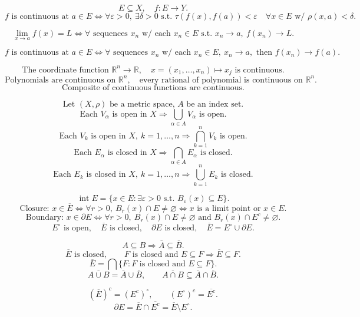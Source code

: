 \documentclass[11pt]{article}
\begin{document}
\[
E\subseteq X,\quad f:E\to Y.
\]
\[
f\text{ is continuous at }a\in E
\Longleftrightarrow
\forall\varepsilon>0,\ \exists\delta>0\text{ s.t. }
\tau(f(x),f(a))<\varepsilon
\quad \forall x\in E\text{ w/ }\rho(x,a)<\delta.
\]

\[
\lim_{x\to a}f(x)=L
\Longleftrightarrow
\forall\text{ sequences }x_n\text{ w/ each }x_n\in E
\text{ s.t. }x_n\to a,\ f(x_n)\to L.
\]

\[
f\text{ is continuous at }a\in E
\Longleftrightarrow
\forall\text{ sequences }x_n\text{ w/ each }x_n\in E,\ x_n\to a,\text{ then }f(x_n)\to f(a).
\]

\[
\text{The coordinate function }\mathbb R^n\to\mathbb R,\quad
x=(x_1,\ldots,x_n)\mapsto x_j\text{ is continuous.}
\]
\[
\text{Polynomials are continuous on }\mathbb R^n,\quad
\text{every rational of polynomial is continuous on }\mathbb R^n.
\]
\[
\text{Composite of continuous functions are continuous.}
\]


\[
\text{Let }(X,\rho)\text{ be a metric space, }A\text{ be an index set.}
\]
\[
\text{Each }V_\alpha\text{ is open in }X\Longrightarrow\bigcup_{\alpha\in A}V_\alpha
\text{ is open.}
\]
\[
\text{Each }V_k\text{ is open in }X,\ k=1,\ldots,n
\Longrightarrow\bigcap_{k=1}^{n}V_k\text{ is open.}
\]
\[
\text{Each }E_\alpha\text{ is closed in }X\Longrightarrow\bigcap_{\alpha\in A}E_\alpha
\text{ is closed.}
\]
\[
\text{Each }E_k\text{ is closed in }X,\ k=1,\ldots,n
\Longrightarrow\bigcup_{k=1}^{n}E_k\text{ is closed.}
\]

\[
\operatorname{int}E
=\{x\in E:\exists\varepsilon>0\text{ s.t. }B_\varepsilon(x)\subseteq E\}.
\]
\[
\text{Closure: }x\in\overline E
\Longleftrightarrow
\forall r>0,\ B_r(x)\cap E\ne\varnothing
\Longleftrightarrow
x\text{ is a limit point or }x\in E.
\]
\[
\text{Boundary: }x\in\partial E
\Longleftrightarrow
\forall r>0,\ B_r(x)\cap E\ne\varnothing
\text{ and }B_r(x)\cap E^c\ne\varnothing.
\]
\[
E^\circ\text{ is open},\quad \overline E\text{ is closed},\quad
\partial E\text{ is closed},\quad
\overline E=E^\circ\cup\partial E.
\]

\[
A\subseteq B\Longrightarrow \overline A\subseteq\overline B.
\]
\[
\overline E\text{ is closed},\qquad
F\text{ is closed and }E\subseteq F\Longrightarrow \overline E\subseteq F.
\]
\[
\overline E=\bigcap\{F:F\text{ is closed and }E\subseteq F\}.
\]
\[
\overline{A\cup B}=\overline A\cup\overline B,\qquad
\overline{A\cap B}\subseteq\overline A\cap\overline B.
\]

\[
(\overline E)^c=(E^c)^\circ,\qquad (E^\circ)^c=\overline{E^c}.
\]
\[
\partial E=\overline E\cap\overline{E^c}= \overline E\setminus E^\circ.
\]
\end{document}
